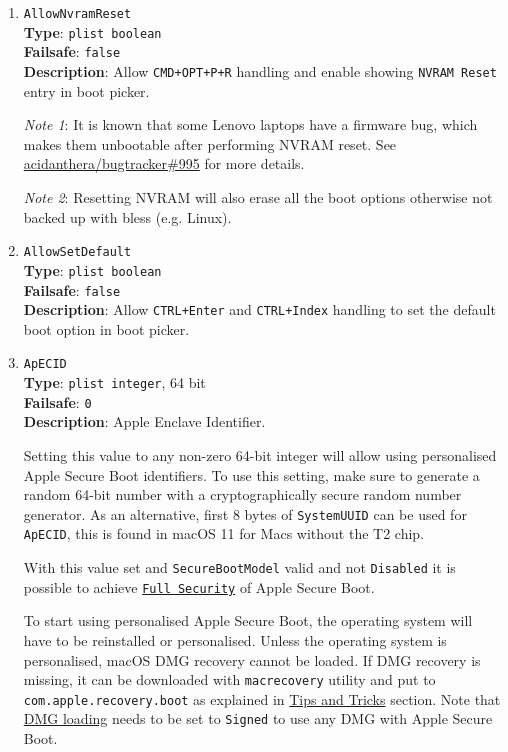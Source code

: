 \documentclass[]{article}
\begin{document}
\begin{enumerate}

\item
  \texttt{AllowNvramReset}\\
  \textbf{Type}: \texttt{plist\ boolean}\\
  \textbf{Failsafe}: \texttt{false}\\
  \textbf{Description}: Allow \texttt{CMD+OPT+P+R} handling and enable
  showing \texttt{NVRAM Reset} entry in boot picker.

  \emph{Note 1}: It is known that some Lenovo laptops have a firmware
  bug, which makes them unbootable after performing NVRAM reset. See
  \href{https://github.com/acidanthera/bugtracker/issues/995}{acidanthera/bugtracker\#995}
  for more details.

  \emph{Note 2}: Resetting NVRAM will also erase all the boot options
  otherwise not backed up with bless (e.g. Linux).

\item
  \texttt{AllowSetDefault}\\
  \textbf{Type}: \texttt{plist\ boolean}\\
  \textbf{Failsafe}: \texttt{false}\\
  \textbf{Description}: Allow \texttt{CTRL+Enter} and \texttt{CTRL+Index} handling
  to set the default boot option in boot picker.

\item
  \texttt{ApECID}\\
  \textbf{Type}: \texttt{plist\ integer}, 64 bit\\
  \textbf{Failsafe}: \texttt{0}\\
  \textbf{Description}: Apple Enclave Identifier.

  Setting this value to any non-zero 64-bit integer will allow using
  personalised Apple Secure Boot identifiers. To use this setting,
  make sure to generate a random 64-bit number with a cryptographically secure
  random number generator. As an alternative, first 8 bytes of \texttt{SystemUUID}
  can be used for \texttt{ApECID}, this is found in macOS 11 for Macs without
  the T2 chip.

  With this value set and \texttt{SecureBootModel} valid
  and not \texttt{Disabled} it is possible to achieve
  \href{https://support.apple.com/en-us/HT208330}{\texttt{Full Security}} of Apple
  Secure Boot.

  To start using personalised Apple Secure Boot, the operating system will have
  to be reinstalled or personalised. Unless the operating system is personalised,
  macOS DMG recovery cannot be loaded. If DMG recovery is missing,
  it can be downloaded with \texttt{macrecovery} utility and put to
  \texttt{com.apple.recovery.boot} as explained in
  \hyperref[reinstallmacos]{Tips and Tricks} section. Note that
  \hyperref[securedmgloading]{DMG loading} needs to be set to \texttt{Signed}
  to use any DMG with Apple Secure Boot.


\end{enumerate}
\end{document}
